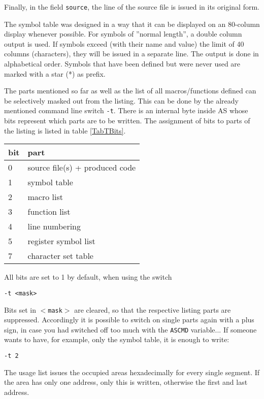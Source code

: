 \documentclass[12pt,twoside]{report}
\newcommand{\tty}[1]{{\tt #1}}
\begin{document}
Finally, in the field \tty{source}, the line of the source file is issued in
its original form.

The symbol table was designed in a way that it can be displayed on an
80-column display whenever possible. For symbols of ''normal length'',
a double column output is used.  If symbols exceed (with their name
and value) the limit of 40 columns (characters), they will be issued
in a separate line. The output is done in alphabetical order.
Symbols that have been defined but were never used are marked with a
star (*) as prefix.

The parts mentioned so far as well as the list of all macros/functions
defined can be selectively masked out from the listing.
This can be done by the already mentioned command line switch \tty{-t}.
There is an internal byte inside AS whose bits represent which parts
are to be written.  The assignment of bits to parts of the listing is
listed in table \ref{TabTBits}.
\par
\begin{table*}[htb]
\begin{center}\begin{tabular}{|l|l|}
\hline
bit &  part \\
\hline
\hline
0   & source file(s) + produced code \\
1   & symbol table \\
2   & macro list \\
3   & function list \\
4   & line numbering \\
5   & register symbol list \\
7   & character set table \\
\hline
\end{tabular}\end{center}
\caption{Assignment of Bits to Listing Components\label{TabTBits}}
\end{table*}
All bits are set to 1 by default, when using the switch
\begin{verbatim}
-t <mask>
\end{verbatim}
Bits set in \tty{$<$mask$>$} are cleared, so that the respective listing
parts are suppressed.  Accordingly it is possible to switch on single
parts again with a plus sign, in case you had switched off too much
with the \tty{ASCMD} variable... If someone wants to have, for example,
only the symbol table, it is enough to write:
\begin{verbatim}
-t 2
\end{verbatim}
The usage list issues the occupied areas hexadecimally for every
single segment.  If the area has only one address, only this is written,
otherwise the first and last address.
\end{document}

